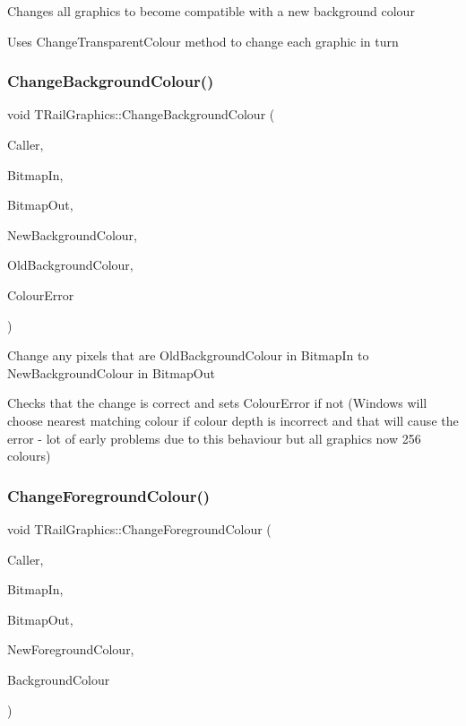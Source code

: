 Changes all graphics to become compatible with a new background colour

Uses \textquotesingle{}Change\+Transparent\+Colour\textquotesingle{} method to change each graphic in turn \mbox{\label{class_t_rail_graphics_a74d7dcd5e17ef156d8c216c8e524de11}} 
\subsubsection{\texorpdfstring{Change\+Background\+Colour()}{ChangeBackgroundColour()}}
{\footnotesize\ttfamily void T\+Rail\+Graphics\+::\+Change\+Background\+Colour (\begin{DoxyParamCaption}\item[{int}]{Caller,  }\item[{Graphics\+::\+T\+Bitmap $\ast$}]{Bitmap\+In,  }\item[{Graphics\+::\+T\+Bitmap $\ast$}]{Bitmap\+Out,  }\item[{T\+Color}]{New\+Background\+Colour,  }\item[{T\+Color}]{Old\+Background\+Colour,  }\item[{bool \&}]{Colour\+Error }\end{DoxyParamCaption})}

Change any pixels that are Old\+Background\+Colour in Bitmap\+In to New\+Background\+Colour in Bitmap\+Out

Checks that the change is correct and sets Colour\+Error if not (Windows will choose nearest matching colour if colour depth is incorrect and that will cause the error -\/ lot of early problems due to this behaviour but all graphics now 256 colours) \mbox{\label{class_t_rail_graphics_aa2dace651659e084ec23c9961f5819b1}} 
\subsubsection{\texorpdfstring{Change\+Foreground\+Colour()}{ChangeForegroundColour()}}
{\footnotesize\ttfamily void T\+Rail\+Graphics\+::\+Change\+Foreground\+Colour (\begin{DoxyParamCaption}\item[{int}]{Caller,  }\item[{Graphics\+::\+T\+Bitmap $\ast$}]{Bitmap\+In,  }\item[{Graphics\+::\+T\+Bitmap $\ast$}]{Bitmap\+Out,  }\item[{T\+Color}]{New\+Foreground\+Colour,  }\item[{T\+Color}]{Background\+Colour }\end{DoxyParamCaption})}

